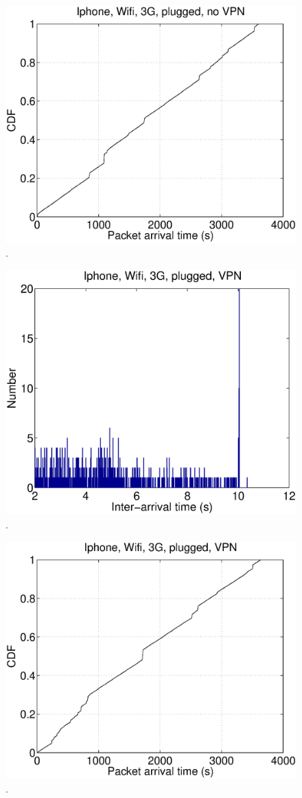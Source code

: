 \begin{figure}
\centering
        \includegraphics[width=0.8\linewidth]{../../code/pushNotification/Fig/bw_iphone_wifi_3g_plug_novpn_ts.eps}
  \caption{.}
  \label{fig:}
\end{figure}

\begin{figure}
\centering
        \includegraphics[width=0.8\linewidth]{../../code/pushNotification/Fig/bw_iphone_wifi_3g_plug_vpn_interTs.eps}
  \caption{.}
  \label{fig:}
\end{figure}

\begin{figure}
\centering
        \includegraphics[width=0.8\linewidth]{../../code/pushNotification/Fig/bw_iphone_wifi_3g_plug_vpn_ts.eps}
  \caption{.}
  \label{fig:}
\end{figure}

